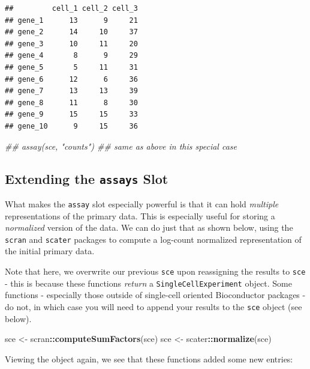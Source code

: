 \documentclass[]{book}
\newenvironment{Shaded}{\begin{snugshade}}{\end{snugshade}}
\newcommand{\CommentTok}[1]{\textcolor[rgb]{0.56,0.35,0.01}{\textit{#1}}}
\newcommand{\KeywordTok}[1]{\textcolor[rgb]{0.13,0.29,0.53}{\textbf{#1}}}
\newcommand{\NormalTok}[1]{#1}
\newcommand{\OperatorTok}[1]{\textcolor[rgb]{0.81,0.36,0.00}{\textbf{#1}}}
\newcommand{\StringTok}[1]{\textcolor[rgb]{0.31,0.60,0.02}{#1}}
\begin{document}
\begin{verbatim}
##         cell_1 cell_2 cell_3
## gene_1      13      9     21
## gene_2      14     10     37
## gene_3      10     11     20
## gene_4       8      9     29
## gene_5       5     11     31
## gene_6      12      6     36
## gene_7      13     13     39
## gene_8      11      8     30
## gene_9      15     15     33
## gene_10      9     15     36
\end{verbatim}

\begin{Shaded}
\begin{Highlighting}[]
\CommentTok{## assay(sce, "counts") ## same as above in this special case}
\end{Highlighting}
\end{Shaded}

\hypertarget{extending-the-assays-slot}{%
\subsection{\texorpdfstring{Extending the \texttt{assays} Slot}{Extending the assays Slot}}\label{extending-the-assays-slot}}

What makes the \texttt{assay} slot especially powerful is that it can hold \emph{multiple} representations of the primary data. This is especially useful for storing a \emph{normalized} version of the data. We can do just that as shown below, using the \texttt{scran} and \texttt{scater} packages to compute a log-count normalized representation of the initial primary data.

Note that here, we overwrite our previous \texttt{sce} upon reassigning the results to \texttt{sce} - this is because these functions \emph{return} a \texttt{SingleCellExperiment} object. Some functions - especially those outside of single-cell oriented Bioconductor packages - do not, in which case you will need to append your results to the \texttt{sce} object (see below).

\begin{Shaded}
\begin{Highlighting}[]
\NormalTok{sce <-}\StringTok{ }\NormalTok{scran}\OperatorTok{::}\KeywordTok{computeSumFactors}\NormalTok{(sce)}
\NormalTok{sce <-}\StringTok{ }\NormalTok{scater}\OperatorTok{::}\KeywordTok{normalize}\NormalTok{(sce)}
\end{Highlighting}
\end{Shaded}

Viewing the object again, we see that these functions added some new entries:
\end{document}

